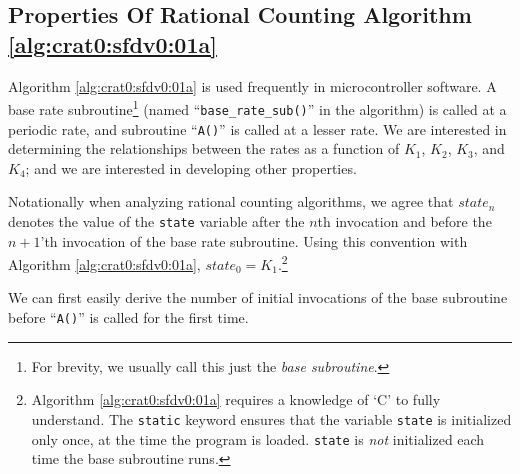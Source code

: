 \subsection[Properties Of Algorithm \ref{alg:crat0:sfdv0:01a}]
           {Properties Of Rational Counting Algorithm \ref{alg:crat0:sfdv0:01a}}
\label{crat0:sfdv0:sprc0}

Algorithm \ref{alg:crat0:sfdv0:01a} 
is used frequently in microcontroller
software.  A base rate subroutine\footnote{For brevity, we usually
call this just the \emph{base subroutine}.} (named ``\texttt{base\_rate\_sub()}''
in the algorithm) is called at a periodic rate, and subroutine
``\texttt{A()}'' is called at a lesser rate.
We are interested in determining the relationships between the rates
as a function of $K_1$, $K_2$, $K_3$, and $K_4$; and we are interested
in developing other properties.

Notationally when analyzing rational counting algorithms, we agree
that $state_n$ denotes the value of the \texttt{state} variable 
after the $n$th invocation and before the $n+1$'th invocation
of the base rate subroutine.
Using this convention with Algorithm \ref{alg:crat0:sfdv0:01a}, 
$state_0 = K_1$.\footnote{Algorithm \ref{alg:crat0:sfdv0:01a} 
requires a knowledge of
`C' to fully understand.  The \texttt{static} keyword ensures that the
variable \texttt{state} is initialized only once, at the time the program
is loaded.  \texttt{state} is \emph{not} initialized each time the 
base subroutine runs.}

We can first easily derive the number of initial invocations of
the base subroutine before ``\texttt{A()}'' is called for the first 
time.

